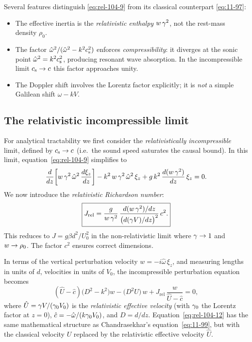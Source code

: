 Several features distinguish \eqref{eq:rel-104-9} from its classical
counterpart \eqref{eq:11-97}:
\begin{itemize}
\item The effective inertia is the \emph{relativistic enthalpy}
  $w\,\gamma^2$, not the rest-mass density $\rho_0$.
\item The factor $\hat\omega^2/(\hat\omega^2 - k^2c_{\mathrm{s}}^2)$ enforces
  \emph{compressibility}: it diverges at the sonic point
  $\hat\omega^2 = k^2c_{\mathrm{s}}^2$, producing resonant wave absorption.
  In the incompressible limit $c_{\mathrm{s}}\to c$ this factor approaches unity.
\item The Doppler shift involves the Lorentz factor explicitly; it is
  \emph{not} a simple Galilean shift $\omega - kV$.
\end{itemize}

\subsection{The relativistic incompressible limit}
\label{sec:rel-11-104-pert-incomp}

For analytical tractability we first consider the
\emph{relativistically incompressible} limit, defined by
$c_{\mathrm{s}} \to c$ (i.e.\ the sound speed saturates the causal bound).
In this limit, equation~\eqref{eq:rel-104-9} simplifies to
\begin{equation}
\label{eq:rel-104-10}
\frac{d}{dz}\!\left[w\,\gamma^2\,\hat\omega^2\,
  \frac{d\xi_z}{dz}\right]
- k^2\,w\,\gamma^2\,\hat\omega^2\,\xi_z
+ g\,k^2\,\frac{d(w\,\gamma^2)}{dz}\,\xi_z = 0.
\end{equation}
We now introduce the \emph{relativistic Richardson number}:
\begin{equation}
\label{eq:rel-104-11}
\boxed{J_{\mathrm{rel}}
  = \frac{g}{w\,\gamma^2}\,
    \frac{d(w\,\gamma^2)/dz}
         {\bigl(d(\gamma V)/dz\bigr)^2}\,c^2.}
\end{equation}
This reduces to $J = g\beta d^2/U_0^2$ in the non-relativistic
limit where $\gamma\to 1$ and $w\to\rho_0$.  The factor
$c^2$ ensures correct dimensions.

In terms of the vertical perturbation velocity
$w = -i\hat\omega\,\xi_z$, and measuring lengths in units of $d$,
velocities in units of $V_0$, the incompressible perturbation equation
becomes
\begin{equation}
\label{eq:rel-104-12}
(\hat{U}-\hat{c})\bigl(D^2 - k^2\bigr)w
- \bigl(D^2\hat{U}\bigr)\,w
+ J_{\mathrm{rel}}\,\frac{w}{\hat{U}-\hat{c}} = 0,
\end{equation}
where $\hat{U} = \gamma V/(\gamma_0 V_0)$ is the
\emph{relativistic effective velocity} (with $\gamma_0$ the Lorentz factor
at $z=0$), $\hat{c} = -\hat\omega/(k\gamma_0 V_0)$, and $D=d/dz$.
Equation~\eqref{eq:rel-104-12} has the same mathematical structure as
Chandrasekhar's equation~\eqref{eq:11-99}, but with the classical
velocity $U$ replaced by the relativistic effective velocity $\hat{U}$.

